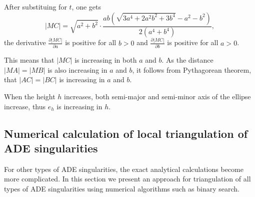 After substituing for $t$, one gets 
$$|MC|=\sqrt{a^2+b^2}\cdot\frac{ab(\sqrt{3a^4+2a^2b^2+3b^4}-a^2-b^2)}{2(a^4+b^4)},$$
the derivative $\frac{\partial|MC|}{\partial a}$ is positive for all $b>0$ and
$\frac{\partial|MC|}{\partial b}$ is positive for all $a>0$.

This means that $|MC|$ is increasing in both $a$ and $b$. As the distance $|MA|=|MB|$ is 
also increasing in $a$ and $b$, it follows from Pythagorean theorem, that $|AC|=|BC|$
is increasing in $a$ and $b$.

When the height $h$ increases, both semi-major and semi-minor axis of the ellipse increase,
thus $e_h$ is increasing in $h$.

\subsection*{Numerical calculation of local triangulation of ADE singularities}

For other types of ADE singularities, the exact analytical calculations become more
complicated. In this section we present an approach for triangulation of all types
of ADE singularities using numerical algorithms such as binary search.

